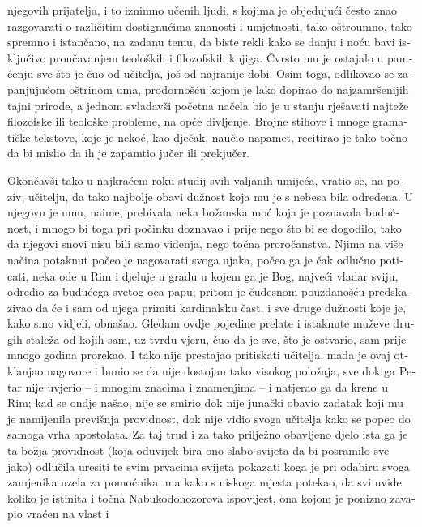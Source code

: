 \documentclass[a5paper,twoside]{article}
\begin{document}
\begin{pages}
\begin{Rightside}
\begin{croatian}
njegovih prijatelja, i to iznimno učenih ljudi, s kojima je objedujući često znao razgovarati o različitim dostignućima znanosti i umjetnosti, tako oštroumno, tako spremno i istančano, na zadanu temu, da biste rekli kako se danju i noću bavi isključivo proučavanjem teoloških i filozofskih knjiga.  Čvrsto mu je ostajalo u pamćenju sve što je čuo od učitelja, još od najranije dobi.  Osim toga, odlikovao se zapanjujućom oštrinom uma, prodornošću kojom je lako dopirao do najzamršenijih tajni prirode, a jednom svladavši početna načela bio je u stanju rješavati najteže filozofske ili teološke probleme, na opće divljenje.  Brojne stihove i mnoge gramatičke tekstove, koje je nekoć, kao dječak, naučio napamet, recitirao je tako točno da bi mislio da ih je zapamtio jučer ili prekjučer.
  
\pend
\pstart
Okončavši tako u najkraćem roku studij svih valjanih umijeća, vratio se, na poziv, učitelju, da tako najbolje obavi dužnost koja mu je s nebesa bila određena.  U njegovu je umu, naime, prebivala neka božanska moć koja je poznavala budućnost, i mnogo bi toga pri počinku doznavao i prije nego što bi se dogodilo, tako da njegovi snovi nisu bili samo viđenja, nego točna proročanstva.  Njima na više načina potaknut počeo je nagovarati svoga ujaka, počeo ga je čak odlučno poticati, neka ode u Rim i djeluje u gradu u kojem ga je Bog, najveći vladar sviju, odredio za budućega svetog oca papu; pritom je čudesnom pouzdanošću predskazivao da će i sam od njega primiti kardinalsku čast, i sve druge dužnosti koje je, kako smo vidjeli, obnašao.  Gledam ovdje pojedine prelate i istaknute muževe drugih staleža od kojih sam, uz tvrdu vjeru, čuo da je sve, što je ostvario, sam prije mnogo godina prorekao.  I tako nije prestajao pritiskati učitelja, mada je ovaj otklanjao nagovore i bunio se da nije dostojan tako visokog položaja, sve dok ga Petar nije uvjerio – i mnogim znacima i znamenjima – i natjerao ga da krene u Rim; kad se ondje našao, nije se smirio dok nije junački obavio zadatak koji mu je namijenila previšnja providnost, dok nije vidio svoga učitelja kako se  popeo do samoga vrha apostolata.  Za taj trud i za tako prilježno obavljeno djelo ista ga je ta božja providnost (koja oduvijek bira ono slabo svijeta da bi posramilo sve jako) odlučila uresiti  te svim prvacima svijeta pokazati koga je pri odabiru svoga zamjenika uzela za pomoćnika, ma kako s niskoga mjesta potekao, da svi uvide koliko je istinita i točna Nabukodonozorova ispovijest, ona kojom je ponizno zavapio vraćen na vlast i 
\end{croatian}
\end{Rightside}
\end{pages}
\end{document}
